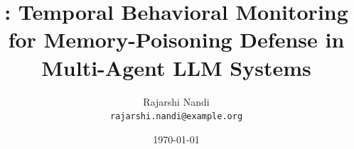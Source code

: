 \documentclass[11pt,a4paper]{article}
\title{\sys: Temporal Behavioral Monitoring\\ for Memory-Poisoning Defense in Multi-Agent LLM Systems}
\author{%
  Rajarshi Nandi\\
  \texttt{rajarshi.nandi@example.org}%
}
\date{\today}
\begin{document}
\maketitle

\begin{abstract}

\end{abstract}












\end{document}

